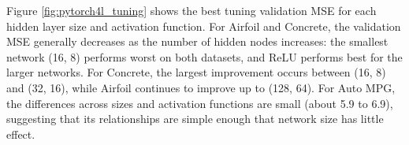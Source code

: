 Figure \ref{fig:pytorch4l_tuning} shows the best tuning validation MSE for each hidden layer size and activation function. For Airfoil and Concrete, the validation MSE generally decreases as the number of hidden nodes increases: the smallest network (16, 8) performs worst on both datasets, and ReLU performs best for the larger networks. For Concrete, the largest improvement occurs between (16, 8) and (32, 16), while Airfoil continues to improve up to (128, 64). For Auto MPG, the differences across sizes and activation functions are small (about 5.9 to 6.9), suggesting that its relationships are simple enough that network size has little effect.
\medskip
\begin{table}[H]
    \centering
    \caption{PyTorch 4L Neural Network Quality of Fit Results}
    \label{tab:pytorch4l_qof}
    \small
\end{table}

